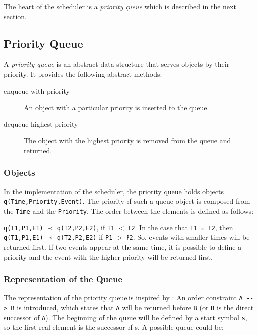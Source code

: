 The heart of the scheduler is a \emph{priority queue} which is described in the next section.

\subsection{Priority Queue}

A \emph{priority queue} is an abstract data structure that serves objects by their priority. It provides the following abstract methods:

\begin{description}
 \item[enqueue with priority] An object with a particular priority is inserted to the queue. 
 \item[dequeue highest priority] The object with the highest priority is removed from the queue and returned.
\end{description}

\subsubsection{Objects}

In the implementation of the scheduler, the priority queue holds objects \verb|q(Time,Priority,Event)|. The priority of such a queue object is composed from the \verb|Time| and the \verb|Priority|. The order between the elements is defined as follows:

\begin{definition}
\verb|q(T1,P1,E1)| $\prec$ \verb|q(T2,P2,E2)|, if \verb|T1| $<$ \verb|T2|. In the case that \verb|T1 = T2|, then \verb|q(T1,P1,E1)| $\prec$ \verb|q(T2,P2,E2)| if \verb|P1| $>$ \verb|P2|. So, events with smaller times will be returned first. If two events appear at the same time, it is possible to define a priority and the event with the higher priority will be returned first. 
\end{definition}

\subsubsection{Representation of the Queue}

The representation of the priority queue is inspired by \cite[38\psqq]{fru_chr_book_2009}: An order constraint \verb|A --> B| is introduced, which states that \verb|A| will be returned before \verb|B| (or \verb|B| is the direct successor of \verb|A|). The beginning of the queue will be defined by a start symbol \verb|s|, so the first real element is the successor of s. A possible queue could be:

